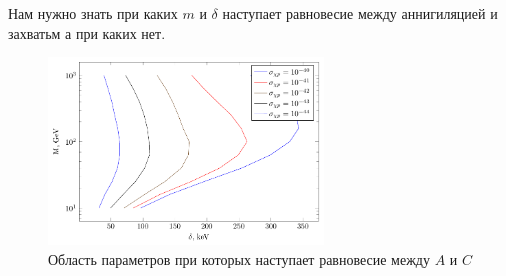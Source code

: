 Нам нужно знать при каких $m$ и $\delta$ наступает равновесие между аннигиляцией и захватьм а при каких нет.

\begin{figure}[!h]
	\centering
	\includegraphics[width=0.65\textwidth]{images/Equilibrium.png}
	\caption{Область параметров при которых наступает равновесие между $A$ и $C$}
\end{figure}
